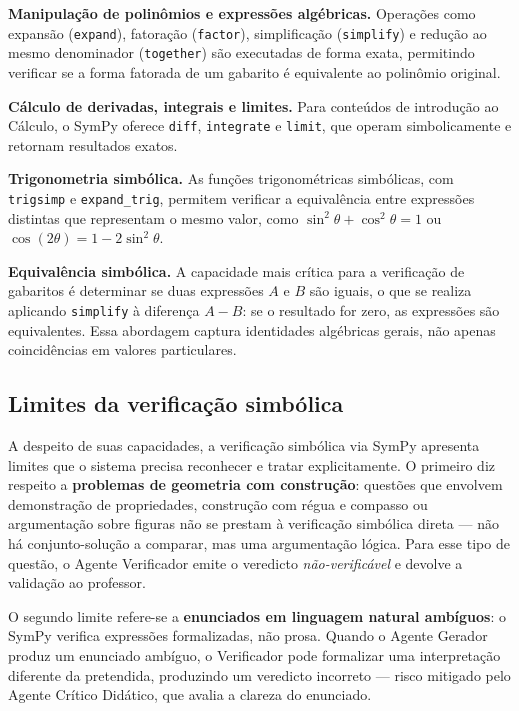 \textbf{Manipulação de polinômios e expressões algébricas.} Operações como expansão
(\texttt{expand}), fatoração (\texttt{factor}), simplificação (\texttt{simplify}) e redução ao mesmo
denominador (\texttt{together}) são executadas de forma exata, permitindo verificar se a forma
fatorada de um gabarito é equivalente ao polinômio original.

\textbf{Cálculo de derivadas, integrais e limites.} Para conteúdos de introdução ao Cálculo, o SymPy
oferece \texttt{diff}, \texttt{integrate} e \texttt{limit}, que operam simbolicamente e retornam
resultados exatos.

\textbf{Trigonometria simbólica.} As funções trigonométricas simbólicas, com \texttt{trigsimp} e
\texttt{expand\_trig}, permitem verificar a equivalência entre expressões distintas que representam o
mesmo valor, como $\sin^2\theta + \cos^2\theta = 1$ ou $\cos(2\theta) = 1 - 2\sin^2\theta$.

\textbf{Equivalência simbólica.} A capacidade mais crítica para a verificação de gabaritos é
determinar se duas expressões $A$ e $B$ são iguais, o que se realiza aplicando \texttt{simplify} à
diferença $A-B$: se o resultado for zero, as expressões são equivalentes. Essa abordagem captura
identidades algébricas gerais, não apenas coincidências em valores particulares.

\subsection{Limites da verificação simbólica}
\label{sub:cas-limites}

A despeito de suas capacidades, a verificação simbólica via SymPy apresenta limites que o sistema
precisa reconhecer e tratar explicitamente. O primeiro diz respeito a \textbf{problemas de geometria
com construção}: questões que envolvem demonstração de propriedades, construção com régua e compasso
ou argumentação sobre figuras não se prestam à verificação simbólica direta --- não há conjunto-solução
a comparar, mas uma argumentação lógica. Para esse tipo de questão, o Agente Verificador emite o
veredicto \emph{não-verificável} e devolve a validação ao professor.

O segundo limite refere-se a \textbf{enunciados em linguagem natural ambíguos}: o SymPy verifica
expressões formalizadas, não prosa. Quando o Agente Gerador produz um enunciado ambíguo, o
Verificador pode formalizar uma interpretação diferente da pretendida, produzindo um veredicto
incorreto --- risco mitigado pelo Agente Crítico Didático, que avalia a clareza do enunciado.

